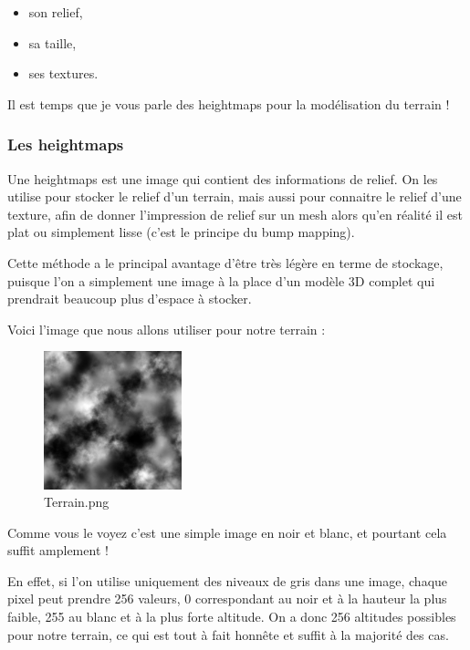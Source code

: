 \begin{itemize}
\item son relief, 
\item sa taille,
\item ses textures.
\end{itemize}

Il est temps que je vous parle des heightmaps pour la mod\'elisation du terrain !


\subsubsection{Les heightmaps}

Une heightmaps est une image qui contient des informations de relief. On les utilise pour stocker le relief d'un terrain, mais aussi pour connaitre le relief d'une texture, afin de donner l'impression de relief sur un mesh alors qu'en r\'ealit\'e il est plat ou simplement lisse (c'est le principe du bump mapping).

Cette m\'ethode a le principal avantage d'\^etre tr\`es l\'eg\`ere en terme de stockage, puisque l'on a simplement une image \`a la place d'un mod\`ele 3D complet qui prendrait beaucoup plus d'espace \`a stocker.

Voici l'image que nous allons utiliser pour notre terrain :
\begin{figure}[hbtp]
\caption{Terrain.png}
\centering
\includegraphics[width=4cm]{Ogre/Base_de_Ogre/Garder_les_pieds_sur_terre/images/terrain.png} %
\end{figure}

Comme vous le voyez c'est une simple image en noir et blanc, et pourtant cela suffit amplement !

En effet, si l'on utilise uniquement des niveaux de gris dans une image, chaque pixel peut prendre 256 valeurs, 0 correspondant au noir et \`a la hauteur la plus faible, 255 au blanc et \`a la plus forte altitude. On a donc 256 altitudes possibles pour notre terrain, ce qui est tout \`a fait honn\^ete et suffit \`a la majorit\'e des cas.


